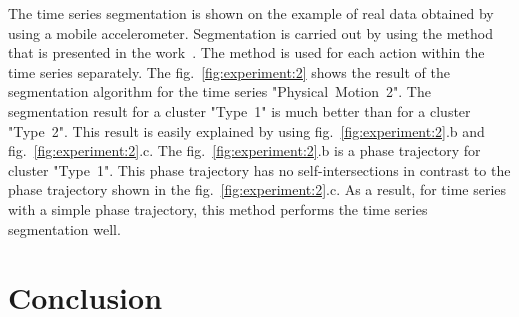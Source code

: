 \documentclass[12pt, twoside]{article}
\numberwithin{equation}{section}
\begin{document}
The time series segmentation is shown on the example of real data obtained by using a mobile accelerometer. Segmentation is carried out by using the method that is presented in the work~\cite{motrenko2015}. The method is used for each action within the time series separately.
The fig.~\ref{fig:experiment:2} shows the result of the segmentation algorithm for the time series "Physical~Motion~2". The segmentation result for a cluster "Type~1" is much better than for a cluster "Type~2". This result is easily explained by using fig.~\ref{fig:experiment:2}.b and fig.~\ref{fig:experiment:2}.c. The fig.~\ref{fig:experiment:2}.b is a phase trajectory for cluster "Type~1". This phase trajectory has no self-intersections in contrast to the phase trajectory shown in the fig.~\ref{fig:experiment:2}.c.
As a result, for time series with a simple phase trajectory, this method performs the time series segmentation well.





\section{Conclusion}
\end{document}
